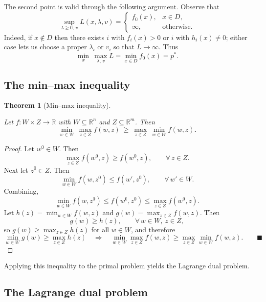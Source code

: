 \documentclass[
  letterpaper,
  DIV=11,
  numbers=noendperiod]{scrreprt}
\theoremstyle{definition}
\theoremstyle{plain}
\newtheorem{theorem}{Theorem}[chapter]
\theoremstyle{plain}
\theoremstyle{definition}
\theoremstyle{plain}
\theoremstyle{plain}
\theoremstyle{remark}
\begin{document}
The second point is valid through the following argument. Observe that
\[
\sup_{\lambda \ge 0,\, v} L(x, \lambda, v) =
\begin{cases}
f_0(x), & x \in D, \\
\infty, & \text{otherwise}.
\end{cases}
\] Indeed, if \(x \notin D\) then there exists \(i\) with \(f_i(x) > 0\)
or \(i\) with \(h_i(x) \ne 0\); either case lets us choose a proper
\(\lambda_i\) or \(v_i\) so that \(L \to \infty\). Thus \[
\min_x \ \max_{\lambda,\, v} L = \min_{x \in D} f_0(x) = p^\ast .
\]

\subsection{The min--max inequality}\label{the-minmax-inequality}

\begin{theorem}[Min--max
inequality]\protect\hypertarget{thm-minmax}{}\label{thm-minmax}

Let \(f : W \times Z \to \mathbb{R}\) with \(W \subseteq \mathbb{R}^n\)
and \(Z \subseteq \mathbb{R}^m\). Then \[
\min_{w \in W} \ \max_{z \in Z} f(w, z) \ \ge\ \max_{z \in Z} \ \min_{w \in W} f(w, z) .
\]

\end{theorem}

\begin{proof}
Let \(w^0 \in W\). Then \[
\max_{z \in Z} f(w^0, z) \ge f(w^0, z), \qquad \forall\, z \in Z .
\] Next let \(z^0 \in Z\). Then \[
\min_{w \in W} f(w, z^0) \le f(w', z^0), \qquad \forall\, w' \in W .
\] Combining, \[
\min_{w \in W} f(w, z^0) \le f(w^0, z^0) \le \max_{z \in Z} f(w^0, z) .
\] Let \(h(z) = \min_{w \in W} f(w, z)\) and
\(g(w) = \max_{z \in Z} f(w, z)\). Then \[
g(w) \ge h(z), \qquad \forall\, w \in W,\ z \in Z ,
\] so \(g(w) \ge \max_{z \in Z} h(z)\) for all \(w \in W\), and
therefore \[
\min_{w \in W} g(w) \ge \max_{z \in Z} h(z)
\quad\Longrightarrow\quad
\min_{w \in W} \max_{z \in Z} f(w, z) \ge \max_{z \in Z} \min_{w \in W} f(w, z) . \qquad\blacksquare
\]
\end{proof}

Applying this inequality to the primal problem yields the Lagrange dual
problem.

\subsection{The Lagrange dual problem}\label{the-lagrange-dual-problem}
\end{document}
